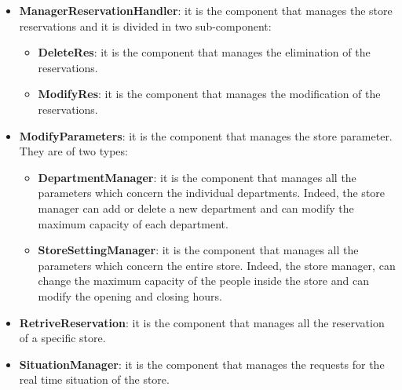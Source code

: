 \documentclass{article}
\begin{document}
			\begin{itemize}
				\item {\bfseries ManagerReservationHandler}: it is the component that manages the store reservations and it is divided in two sub-component:
				
				\begin{itemize}
					\item {\bfseries DeleteRes}: it is the component that manages the elimination of the reservations.
					\item {\bfseries ModifyRes}: it is the component that manages the modification of the reservations.
				\end{itemize}
				
				\item {\bfseries ModifyParameters}: it is the component that manages the store parameter. They are of two types:
				
				\begin{itemize}
					\item {\bfseries DepartmentManager}: it is the component that manages all the parameters which concern the individual departments. Indeed, the store manager can add or delete a new department and can modify the maximum capacity of each department.
					\item {\bfseries StoreSettingManager}: it is the component that manages all the parameters which concern the entire store. Indeed, the store manager, can change the maximum capacity of the people inside the store and can modify the opening and closing hours.
				\end{itemize}
			
				\item {\bfseries RetriveReservation}: it is the component that manages all the reservation of a specific store.
				
				\item {\bfseries SituationManager}: it is the component that manages the requests for the real time situation of the store.
			\end{itemize}
		
\end{document}
